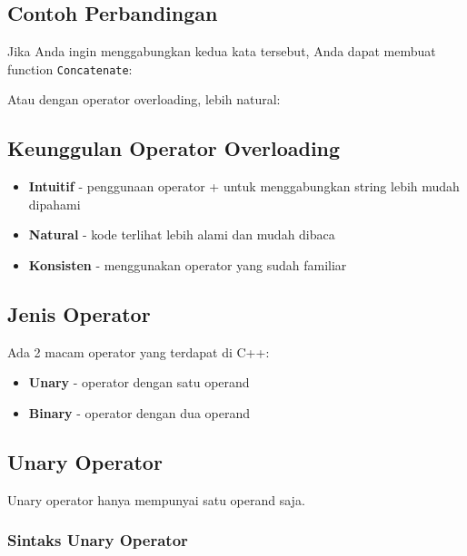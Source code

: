 \subsection{Contoh Perbandingan}



Jika Anda ingin menggabungkan kedua kata tersebut, Anda dapat membuat function \texttt{Concatenate}:



Atau dengan operator overloading, lebih natural:



\subsection{Keunggulan Operator Overloading}

\begin{itemize}
\item \textbf{Intuitif} - penggunaan operator + untuk menggabungkan string lebih mudah dipahami
\item \textbf{Natural} - kode terlihat lebih alami dan mudah dibaca
\item \textbf{Konsisten} - menggunakan operator yang sudah familiar
\end{itemize}

\subsection{Jenis Operator}

Ada 2 macam operator yang terdapat di C++:
\begin{itemize}
\item \textbf{Unary} - operator dengan satu operand
\item \textbf{Binary} - operator dengan dua operand
\end{itemize}

\subsection{Unary Operator}\label{unary-operator}

Unary operator hanya mempunyai satu operand saja.

\subsubsection{Sintaks Unary Operator}

